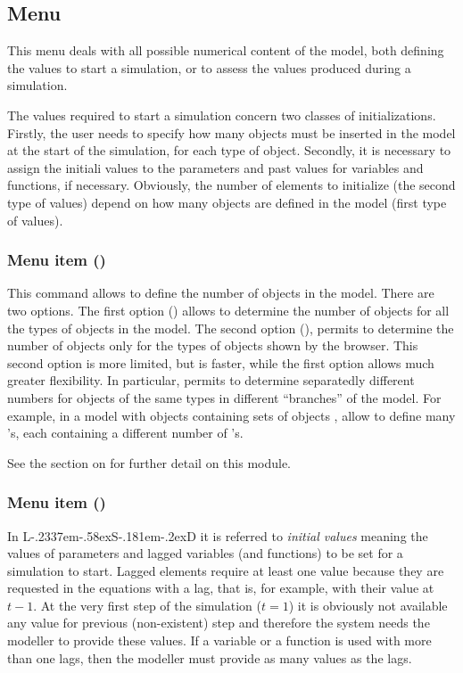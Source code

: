 \documentclass [11pt,a4paper] {book}
\def\LsD{{L\kern-.2337em\lower-.58ex\hbox{S}\kern-.181em\lower-.2ex\hbox{D}}\xspace}
\begin{document}
\subsection{Menu }

This menu deals with all possible numerical content of the model, both defining the values to start a simulation, or to assess the values produced during a simulation.

The values required to start a simulation concern two classes of initializations. Firstly, the user needs to specify how many objects must be inserted in the model at the start of the simulation, for each type of object. Secondly, it is necessary to assign the initiali values to the parameters and past values for variables and functions, if necessary. Obviously, the number of elements to initialize (the second type of values) depend on how many objects are defined in the model (first type of values).

\subsubsection{Menu item  ()}

This command allows to define the number of objects in the model. There are two options. The first option () allows to determine the number of objects for all the types of objects in the model. The second option (), permits to determine the number of objects only for the types of objects shown by the browser. This second option is more limited, but is faster, while the first option allows much greater flexibility. In particular, permits to determine separatedly different numbers for objects of the same types in different ``branches'' of the model. For example, in a model with objects  containing sets of objects , allow to define many 's, each containing a different number of 's.

See the section on  for further detail on this module.

\subsubsection{Menu item  ()}

In \LsD it is referred to \textit{initial values} meaning the values of parameters and lagged variables (and functions) to be set for a simulation to start. Lagged elements require at least one value because they are requested in the equations with a lag, that is, for example, with their value at $t-1$. At the very first step of the simulation ($t=1$) it is obviously not available any value for previous (non-existent) step and therefore the system needs the modeller to provide these values. If a variable or a function is used with more than one lags, then the modeller must provide as many values as the lags.
\end{document}
